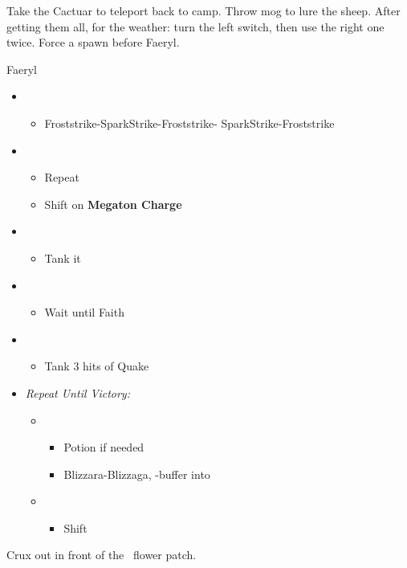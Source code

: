 Take the Cactuar to teleport back to camp. Throw mog to lure the sheep. After getting them all, for the weather: turn the left switch, then use the right one twice. Force a spawn before Faeryl.

\begin{battle}{Faeryl}
	\begin{itemize}
		\item \sixth
		      \begin{itemize}
			      \item Froststrike-SparkStrike-Froststrike- SparkStrike-Froststrike
		      \end{itemize}
		\item \fifth
		      \begin{itemize}
			      \item Repeat
			      \item Shift on \textbf{Megaton Charge}
		      \end{itemize}
		\item \fourth
		      \begin{itemize}
			      \item Tank it
		      \end{itemize}
		\item \second
		      \begin{itemize}
			      \item Wait until Faith
		      \end{itemize}
		\item \fourth
		      \begin{itemize}
			      \item Tank 3 hits of Quake
		      \end{itemize}
		\item \textit{Repeat Until Victory:}
		      \begin{itemize}
			      \item \sixth
			            \begin{itemize}
				            \item Potion if needed
				            \item Blizzara-Blizzaga, \com-buffer into
			            \end{itemize}
			      \item \first
			            \begin{itemize}
				            \item Shift
			            \end{itemize}
		      \end{itemize}
	\end{itemize}
\end{battle}


Crux out in front of the \chu\ flower patch.